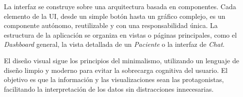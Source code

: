 La interfaz se construye sobre una arquitectura basada en componentes. Cada elemento de la UI, desde un simple botón hasta un gráfico complejo, es un componente autónomo, reutilizable y con una responsabilidad única. La estructura de la aplicación se organiza en vistas o páginas principales, como el \textit{Dashboard} general, la vista detallada de un \textit{Paciente} o la interfaz de \textit{Chat}.

El diseño visual sigue los principios del minimalismo, utilizando un lenguaje de diseño limpio y moderno para evitar la sobrecarga cognitiva del usuario. El objetivo es que la información y las visualizaciones sean las protagonistas, facilitando la interpretación de los datos sin distracciones innecesarias.




